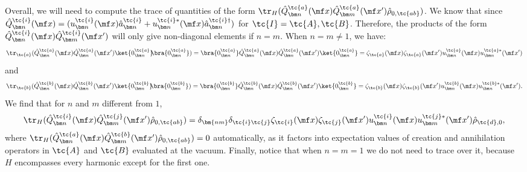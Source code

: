 {Overall, we will need to compute the trace of quantities of the form $\tr_H(\hat{Q}^\tc{a}_{\bm n}(\mf x)\hat{Q}^\tc{a}_{\bm m}(\mf x')\hat{\rho}_{0,\tc{ab}})$. We know that since $\hat{Q}^\tc{i}_{\bm n}(\mf x) = (u_{\bm n}^{\tc{i}}(\mf x)\hat{a}_{\bm n}^\tc{i} + u_{\bm n}^{\tc{i}*}(\mf x)\hat{a}^{\tc{i}\dagger}_{\bm n})$ for $\tc{I} = \tc{A},\tc{B}$. Therefore, the products of the form $\hat{Q}^\tc{i}_{\bm n}(\mf x)\hat{Q}_{\bm m}^\tc{i}(\mf x')$ will only give non-diagonal elements if $n = m$. When $n= m \neq 1$, we have:
\begin{equation}
    \tr_\tc{a}(\hat{Q}^\tc{a}_{\bm n}(\mf x)\hat{Q}^\tc{a}_{\bm n}(\mf x')\ket{0^\tc{a}_{\bm n}}\!\!\bra{0^\tc{a}_{\bm n}}) = \bra{0_{\bm n}^\tc{a}}\hat{Q}^\tc{a}_{\bm n}(\mf x)\hat{Q}^\tc{a}_{\bm n}(\mf x')\ket{0_{\bm n}^\tc{a}} = \zeta_\tc{a}(\mf x)\zeta_\tc{a}(\mf x')u_{\bm n}^\tc{a}(\mf x) u_{\bm n}^{\tc{a}*}(\mf x')
\end{equation}
and
\begin{equation}
    \tr_\tc{b}(\hat{Q}^\tc{b}_{\bm n}(\mf x)\hat{Q}^\tc{b}_{\bm n}(\mf x')\ket{0^\tc{b}_{\bm n}}\!\!\bra{0^\tc{b}_{\bm n}}) = \bra{0_{\bm n}^\tc{b}}\hat{Q}^\tc{b}_{\bm n}(\mf x)\hat{Q}^\tc{b}_{\bm n}(\mf x')\ket{0_{\bm n}^\tc{b}} = \zeta_\tc{b}(\mf x) \zeta_\tc{b}(\mf x')u_{\bm n}^\tc{b}(\mf x) u_{\bm n}^{\tc{b}*}(\mf x').
\end{equation}
We find that for $n$ and $m$ different from $1$,
\begin{equation}
    \tr_H(\hat{Q}_{\bm n}^\tc{i}(\mf x)\hat{Q}_{\bm m}^\tc{j}(\mf x')\hat{\rho}_{0,\tc{ab}}) = \delta_{\bm{nm}} \delta_{\tc{i}\tc{j}} \zeta_\tc{i}(\mf x)\zeta_\tc{j}(\mf x')u_{\bm n}^{\tc{i}}(\mf x)u_{\bm m}^{\tc{j}*}(\mf x')\hat{\rho}_{\tc{d},0},
\end{equation}
where $\tr_H(\hat{Q}_{\bm n}^\tc{a}(\mf x)\hat{Q}_{\bm m}^\tc{b}(\mf x')\hat{\rho}_{0,\tc{ab}}) = 0$ automatically, as it factors into expectation values of creation and annihilation operators in $\tc{A}$ and $\tc{B}$ evaluated at the vacuum. Finally, notice that when $n = m = 1$ we do not need to trace over it, because $H$ encompasses every harmonic except for the first one.

}
